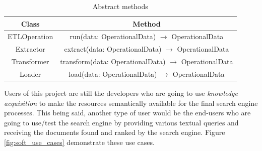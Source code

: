 \begin{table}[H]
	\centering
	\begin{tabular}{|c|c|}
		\hline
		\textbf{Class} & \textbf{Method} \\
		\hline
		ETLOperation & run(data: OperationalData) $\rightarrow$ OperationalData \\
		\hline
		Extractor & extract(data: OperationalData) $\rightarrow$ OperationalData \\
		\hline
		Transformer & transform(data: OperationalData) $\rightarrow$ OperationalData \\
		\hline
		Loader & load(data: OperationalData) $\rightarrow$ OperationalData \\
		\hline
	\end{tabular}
	\caption{Abstract methods}
	\label{tab:abstract_methods}
\end{table}

Users of this project are still the developers who are going to use \textit{knowledge acquisition} to 
make the resources semantically available for the final search engine processes. This being said, 
another type of user would be the end-users who are going to use/test the search engine by providing 
various textual queries and receiving the documents found and ranked by the search engine. Figure 
\ref{fig:soft_use_cases} demonstrate these use cases.

